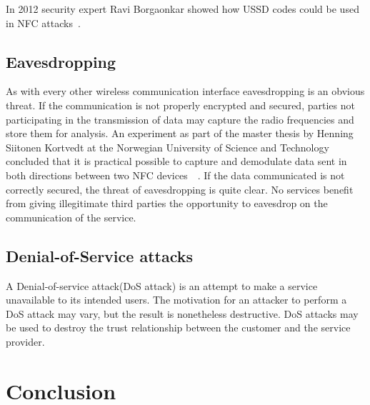 \documentclass[a4paper,11pt]{article}
\begin{document}
In 2012 security expert Ravi Borgaonkar showed how USSD codes could be used in NFC attacks~\cite{USSD}.



\subsection{Eavesdropping}
As with every other wireless communication interface eavesdropping is an obvious threat. If the communication is not properly encrypted and secured, parties not participating in the transmission of data may capture the radio frequencies and store them for analysis. An experiment as part of the master thesis by Henning Siitonen Kortvedt at the Norwegian University of Science and Technology concluded that it is practical possible to capture and demodulate data sent in both directions between two NFC devices~\cite{kortvedt2009eavesdropping}~\cite{kortvedt2009securing}. If the data communicated is not correctly secured, the threat of eavesdropping is quite clear. No services benefit from giving illegitimate third parties the opportunity to eavesdrop on the communication of the service. 


\subsection{Denial-of-Service attacks}
A Denial-of-service attack(DoS attack) is an attempt to make a service unavailable to its intended users. The motivation for an attacker to perform a DoS attack may vary, but the result is nonetheless destructive. DoS attacks may be used to destroy the trust relationship between the customer and the service provider.


\section{Conclusion}
\end{document}
